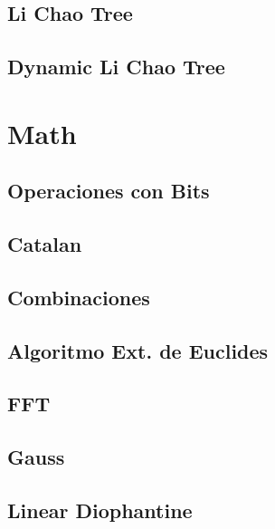 \subsection{Li Chao Tree}
\raggedbottom
\hrulefill
\subsection{Dynamic Li Chao Tree}
\raggedbottom
\hrulefill
\newpage

\section{Math}
\subsection{Operaciones con Bits}
\raggedbottom
\hrulefill
\subsection{Catalan}
\raggedbottom
\hrulefill
\subsection{Combinaciones}
\raggedbottom
\hrulefill
\subsection{Algoritmo Ext. de Euclides}
\raggedbottom
\hrulefill
\subsection{FFT}
\raggedbottom
\hrulefill
\subsection{Gauss}
\raggedbottom
\hrulefill
\subsection{Linear Diophantine}
\raggedbottom
\hrulefill
